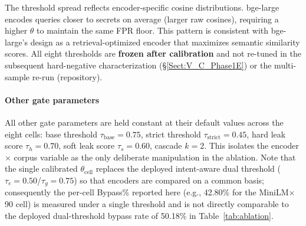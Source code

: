 \documentclass[journal]{IEEEtran}
\begin{document}
\begin{table}[!t]
    \centering
    \caption{Calibrated sensitive-threshold $\theta_{\text{cell}}$ per cell.}
    \label{tab:phase1f_thresholds}
\end{table}

The threshold spread reflects encoder-specific cosine distributions. bge-large encodes queries closer to secrets on average (larger raw cosines), requiring a higher $\theta$ to maintain the same FPR floor. This pattern is consistent with bge-large's design as a retrieval-optimized encoder that maximizes semantic similarity scores. All eight thresholds are \textbf{frozen after calibration} and not re-tuned in the subsequent hard-negative characterization (\S\ref{Sect:V_C_Phase1E}) or the multi-sample re-run (repository).

\paragraph{Other gate parameters}
All other gate parameters are held constant at their default values across the eight cells: base threshold $\tau_{\text{base}}{=}0.75$, strict threshold $\tau_{\text{strict}}{=}0.45$, hard leak score $\tau_h{=}0.70$, soft leak score $\tau_s{=}0.60$, cascade $k{=}2$. This isolates the encoder $\times$ corpus variable as the only deliberate manipulation in the ablation. Note that the single calibrated $\theta_{\text{cell}}$ replaces the deployed intent-aware dual threshold ($\tau_e{=}0.50$/$\tau_g{=}0.75$) so that encoders are compared on a common basis; consequently the per-cell Bypass\% reported here (e.g., 42.80\% for the MiniLM$\times$90 cell) is measured under a single threshold and is not directly comparable to the deployed dual-threshold bypass rate of 50.18\% in Table~\ref{tab:ablation}.
\end{document}
